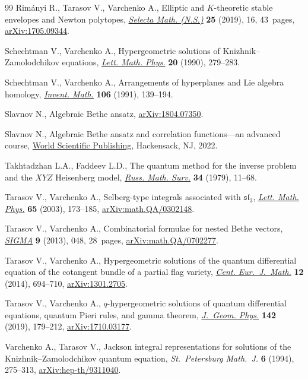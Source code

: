 \documentclass[10pt,a4paper]{amsart}
\numberwithin{equation}{section}
\begin{document}
\begin{thebibliography}{99}
Rim\'anyi R., Tarasov V., Varchenko A., Elliptic and {$K$}-theoretic stable
 envelopes and {N}ewton polytopes,
 \href{https://doi.org/10.1007/s00029-019-0451-5}{\textit{Selecta Math.
 (N.S.)}} \textbf{25} (2019), 16, 43~pages,
 \href{http://arxiv.org/abs/1705.09344}{arXiv:1705.09344}.

Schechtman V., Varchenko A., Hypergeometric solutions of
 {K}nizhnik--{Z}amolodchikov equations,
 \href{https://doi.org/10.1007/BF00626523}{\textit{Lett. Math. Phys.}}
 \textbf{20} (1990), 279--283.

Schechtman V., Varchenko A., Arrangements of hyperplanes and {L}ie algebra
 homology, \href{https://doi.org/10.1007/BF01243909}{\textit{Invent. Math.}}
 \textbf{106} (1991), 139--194.

Slavnov N., Algebraic {B}ethe ansatz,
 \href{http://arxiv.org/abs/1804.07350}{arXiv:1804.07350}.

Slavnov N., Algebraic {B}ethe ansatz and correlation functions---an advanced
 course, \href{https://doi.org/10.1142/12776}{World Scientific Publishing},
 Hackensack, NJ, 2022.

Takhtadzhan L.A., Faddeev L.D., The quantum method for the inverse problem and
 the {$XYZ$} {H}eisenberg model,
 \href{https://doi.org/10.1070/RM1979v034n05ABEH003909}{\textit{Russ. Math.
 Surv.}} \textbf{34} (1979), 11--68.

Tarasov V., Varchenko A., Selberg-type integrals associated with
 {$\mathfrak{sl}_3$},
 \href{https://doi.org/10.1023/B:MATH.0000010712.67685.9d}{\textit{Lett. Math.
 Phys.}} \textbf{65} (2003), 173--185,
 \href{http://arxiv.org/abs/math.QA/0302148}{arXiv:math.QA/0302148}.

Tarasov V., Varchenko A., Combinatorial formulae for nested {B}ethe vectors,
 \href{https://doi.org/10.3842/SIGMA.2013.048}{\textit{SIGMA}} \textbf{9}
 (2013), 048, 28~pages,
 \href{http://arxiv.org/abs/math.QA/0702277}{arXiv:math.QA/0702277}.

Tarasov V., Varchenko A., Hypergeometric solutions of the quantum differential
 equation of the cotangent bundle of a partial flag variety,
 \href{https://doi.org/10.2478/s11533-013-0376-8}{\textit{Cent.
 Eur.~J.~Math.}} \textbf{12} (2014), 694--710,
 \href{http://arxiv.org/abs/1301.2705}{arXiv:1301.2705}.

Tarasov V., Varchenko A., {$q$}-hypergeometric solutions of quantum
 differential equations, quantum {P}ieri rules, and gamma theorem,
 \href{https://doi.org/10.1016/j.geomphys.2019.04.005}{\textit{J.~Geom.
 Phys.}} \textbf{142} (2019), 179--212,
 \href{http://arxiv.org/abs/1710.03177}{arXiv:1710.03177}.

Varchenko A., Tarasov V., Jackson integral representations for solutions of the
 {K}nizhnik--{Z}amolodchikov quantum equation, \textit{St.~Petersburg
 Math.~J.} \textbf{6} (1994), 275--313,
 \href{http://arxiv.org/abs/hep-th/9311040}{arXiv:hep-th/9311040}.

\end{thebibliography}
\end{document}
